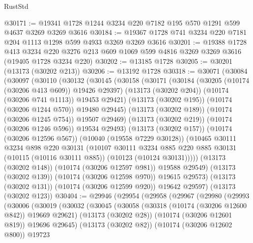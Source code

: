 \begin{lexlean}{RustStd}
\begin{coremodule}
@30171 := @19341 @1728 @1244 @3234 @220 @7182 @195 @570 @1291 @599 @4637 @3269 @3269 @3616
@30184 := @19367 @1728 @741 @3234 @220 @7181 @204 @1113 @1298 @599 @4933 @3269 @3269 @3616
@30201 := @19388
    @1728
    @413
    @3234
    @220
    @3276
    @213
    @609
    @1069
    @599
    @4816
    @3269
    @3269
    @3616
    (@19405 @1728 @3234 @220)
@30202 := @13185 @1728
@30205 := @30201 (@13173 (@30202 @213))
@30206 := @13192 @1728
@30318 := @30071
    (@30084
      (@30097
        (@30110
          (@30132
            (@30145
              (@30158
                (@30171
                  (@30184
                    (@30205 (@10174 (@30206 @413 @609)) @19426 @29397)
                    (@13173 (@30202 @204))
                    (@10174 (@30206 @741 @1113))
                    @19453
                    @29421)
                  (@13173 (@30202 @195))
                  (@10174 (@30206 @1244 @570))
                  @19480
                  @29445)
                (@13173 (@30202 @189))
                (@10174 (@30206 @1245 @754))
                @19507
                @29469)
              (@13173 (@30202 @219))
              (@10174 (@30206 @1246 @596))
              @19534
              @29493)
            (@13173 (@30202 @157))
            (@10174 (@30206 @12596 @567))
            (@10040 (@19558 @7229 @30128))
            (@10465
              @30111
              @3234
              @898
              @220
              @30131
              (@10107
                @30111
                @3234
                @885
                @220
                @885
                @30131
                (@10115 (@10116 @30111 @885))
                (@10123 (@10124 @30131)))))
          (@13173 (@30202 @148))
          (@10174 (@30206 @12597 @981))
          @19588
          @29549)
        (@13173 (@30202 @139))
        (@10174 (@30206 @12598 @970))
        @19615
        @29573)
      (@13173 (@30202 @131))
      (@10174 (@30206 @12599 @920))
      @19642
      @29597)
    (@13173 (@30202 @123))
@30404 := @29946
    (@29954
      (@29958
        (@29967
          (@29980
            (@29993
              (@30006
                (@30019
                  (@30032
                    (@30045
                      (@30058
                        (@30318 (@10174 (@30206 @12600 @842)) @19669 @29621)
                        (@13173 (@30202 @28))
                        (@10174 (@30206 @12601 @819))
                        @19696
                        @29645)
                      (@13173 (@30202 @82))
                      (@10174 (@30206 @12602 @800))
                      @19723

\end{coremodule}
\end{lexlean}
